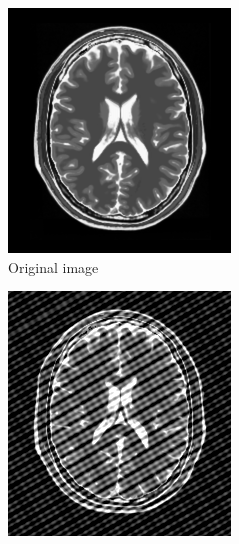 \documentclass[UTF8]{ctexart}
\begin{document}
\begin{figure}[htbp]
    \centering
    \begin{subfigure}{0.3\textwidth}
        \centering
        \includegraphics[width=\linewidth]{brainimg.png}
        \caption{Original image}
    \end{subfigure}%
    \hfill
    \begin{subfigure}{0.3\textwidth}
        \centering
        \includegraphics[width=\linewidth]{noisy_image.png}

\end{subfigure}
\end{figure}
\end{document}
